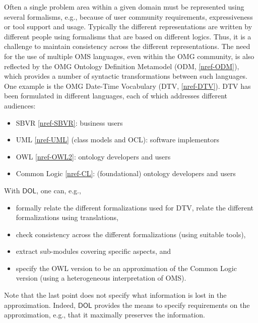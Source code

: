 \documentclass[10pt, a4paper]{isov2}
\newcommand*{\DOL}{\ensuremath{\mathsf{DOL}}\xspace}
\renewcommand{\noterefname}{note}
\renewcommand{\nref}[1]{\noterefname~\ref{#1}}
\renewcommand{\nref}[1]{\ref{nref-#1}}
\begin{document}

\label{model-3}

Often a single problem area within a given domain must be represented using several formalisms, e.g., because of user community requirements, expressiveness or tool support 
and usage. 
Typically the different representations are written by different people using formalisms that are based on different logics. Thus, it is a challenge to maintain 
consistency across the different representations. 
The need for the use of multiple OMS languages, even within the OMG community, is also reflected by the OMG Ontology Definition Metamodel (ODM, \nref{ODM}), which 
provides a number of syntactic transformations between such languages.
One example is the OMG Date-Time Vocabulary (DTV, \nref{DTV}). DTV has been formulated in different languages, each of which addresses different audiences:
 \begin{itemize} 
\item	 SBVR \nref{SBVR}: business users
\item 	UML \nref{UML} (class models and OCL): software implementors
\item 	OWL \nref{OWL2}: ontology developers and users
\item 	Common Logic \nref{CL}: (foundational) ontology developers and users
 \end{itemize} 
With \DOL, one can, e.g.,
 \begin{itemize} 
\item 	formally relate the different formalizations used for DTV, relate the different formalizations using translations,
\item 	check consistency across the different formalizations (using suitable tools),
\item 	extract sub-modules covering specific aspects, and
\item 	specify the OWL version to be an approximation of the Common Logic version (using a heterogeneous interpretation of OMS).
 \end{itemize} 
Note that the last point does not specify what information is lost in the approximation. Indeed, \DOL provides the means to specify requirements on the approximation, e.g., that it maximally preserves the information. 
\end{document}
